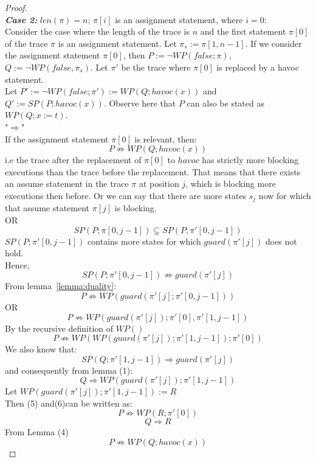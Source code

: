 \documentclass{article}
\newcommand{\limp}{\Rightarrow}
\begin{document}
\begin{proof}
\\
\textit{\textbf{Case 2:}} $len(\pi)=n$; $\pi[i]$ is an assignment statement, where $i=0$: \\
Consider the case where the length of the trace is $n$ and the first statement $\pi[0]$ of the trace $\pi$ is an assignment statement. Let $\pi_s := \pi[1,n-1]$. If we consider the assignment statement $\pi[0]$, then $P:= \neg WP(false; \pi)$, $Q:= \neg WP(false, \pi_s)$. Let $\pi'$ be the trace where $\pi[0]$ is replaced by a havoc statement.\\
Let $P' := \neg WP(false; \pi') := WP(Q; havoc(x))$ and $Q' := SP(P; havoc(x))$. Observe here that $P$ can also be stated as $WP(Q; x:=t)$.\\
"$\Rightarrow$"\\
If the assignment statement $\pi[0]$ is relevant, then:
$$P \not \limp WP(Q; havoc(x))$$
i.e the trace after the replacement of $\pi[0]$ to $havoc$ has strictly more blocking executions than the trace before the replacement. That means that there exists an assume statement in the trace $\pi$ at position $j$, which is blocking more executions then before. Or we can say that there are more states $s_j$ now for which that assume statement $\pi[j]$ is blocking.\\
OR
$$SP(P; \pi[0,j-1]) \subsetneq SP(P; \pi'[0,j-1])$$
$SP(P; \pi'[0,j-1])$ contains more states for which $guard(\pi'[j])$ does not hold. \\
Hence,
$$SP(P; \pi'[0,j-1]) \not \limp guard(\pi'[j])$$
From lemma~\ref{lemma:duality}:
$$P \not \limp WP(guard(\pi'[j]; \pi'[0,j-1]))$$
OR
$$P \not\limp WP(guard(\pi'[j]);\pi'[0],\pi'[1,j-1])$$
By the recursive definition of $WP()$
\begin{equation} 
P \not\limp WP( WP(guard(\pi'[j]);\pi'[1,j-1]);\pi'[0])
\end{equation}
We also know that: 
$$SP(Q; \pi'[1,j-1]) \limp guard(\pi'[j])$$
and consequently from lemma (1):
\begin{equation} 
Q \limp WP(guard(\pi'[j]); \pi'[1,j-1])
\end{equation}
Let $WP(guard(\pi'[j]); \pi'[1,j-1]) := R$\\
Then (5) and(6)can be written as:
$$P \not\limp WP( R;\pi'[0])$$
$$Q \limp R$$
From Lemma (4)
\begin{equation} 
P \not\limp WP(Q; havoc(x))
\end{equation}

\end{proof}
\end{document}
